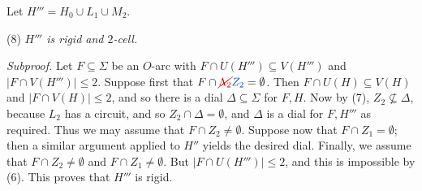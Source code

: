 Let $H''' = H_0 \cup L_1 \cup M_2$.

\hspace*{12pt}(8) \textit{$H'''$ is rigid and $2$-cell.}

\textit{Subproof.} Let $F \subseteq \Sigma$ be an $O$-arc with $F \cap U(H''') \subseteq V(H''')$ and $|F \cap V(H''')| \le 2$. Suppose first that $F \cap \delm{\Lambda_2}\fix{Z_2} = \emptyset$. Then $F \cap U(H) \subseteq V(H)$ and $|F \cap V(H)| \le 2$, and so there is a dial $\Delta \subseteq \Sigma$ for $F, H$. Now by (7), $Z_2 \not\subseteq \Delta$, because $L_2$ has a circuit, and so $Z_2 \cap \Delta = \emptyset$, and $\Delta$ is a dial for $F, H'''$ as required. Thus we may assume that $F \cap Z_2 \ne \emptyset$. Suppose now that $F \cap Z_1 = \emptyset$; then a similar argument applied to $H''$ yields the desired dial. Finally, we assume that $F \cap Z_2 \ne \emptyset$ and $F \cap Z_1 \ne \emptyset$. But $|F \cap U(H''')| \le 2$, and this is impossible by (6). This proves that $H'''$ is rigid.
